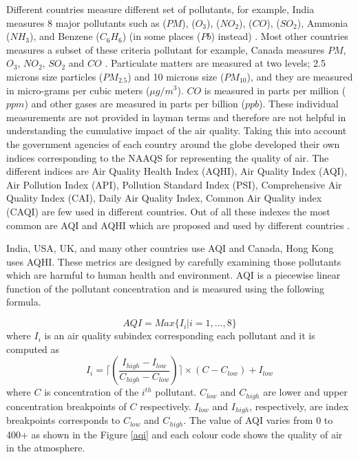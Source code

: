 Different countries measure different set of pollutants, for example, India measures 8 major pollutants such as ($PM$), ($O_3$), ($NO_2$), ($CO$), ($SO_2$), Ammonia ($NH_3$), and Benzene ($C_6H_6$) (in some places ($Pb$) instead) \cite{Chen2013}. Most other countries measures a subset of these criteria pollutant for example, Canada measures $PM$, $O_3$, $NO_2$, $SO_2$ and $CO$ \cite{Chen2013}. Particulate matters are measured at two levels; 2.5 microns size particles ($PM_{2.5}$) and 10 microns size ($PM_{10}$), and they are measured in micro-grams per cubic meters ($\mu g/m^3$). $CO$ is measured in parts per million ($ppm$) and other gases are measured in parts per billion ($ppb$). These individual measurements are not provided in layman terms and therefore are not helpful in understanding the cumulative impact of the air quality. Taking this into account the government agencies of each country around the globe developed their own indices corresponding to the NAAQS for representing the quality of air. The different indices are Air Quality Health Index (AQHI), Air Quality Index (AQI), Air Pollution Index (API), Pollution Standard Index (PSI), Comprehensive Air Quality Index (CAI), Daily Air Quality Index, Common Air Quality index (CAQI) are few used in different countries.
Out of all these indexes the most common are AQI and AQHI which are proposed and used by different countries \cite{Chen2013}.

India, USA, UK, and many other countries use AQI and Canada, Hong Kong uses AQHI. These metrics are designed  by carefully examining those pollutants which are harmful to human health and environment.
AQI is a piecewise linear function of the pollutant concentration \cite{Soni2016} and is measured using the following formula.

\begin{equation}
AQI = Max \{I_i|i = 1, ..., 8\}
\end{equation}
where $I_i$ is an air quality subindex corresponding each pollutant and it is computed as 
\begin{equation}
I_i = \lceil(\frac{I_{high} - I_{low}}{C_{high} - C_{low}})\rceil \times (C - C_{low}) + I_{low}
\end{equation}
where $C$ is concentration of the $i^{th}$ pollutant. $C_{low}$ and $C_{high}$ are lower and upper concentration breakpoints of $C$ respectively.
$I_{low}$ and $I_{high}$, respectively, are index breakpoints corresponds to $C_{low}$ and $C_{high}$.  The value of AQI varies from 0 to 400+ as shown in the Figure \ref{aqi} and each colour code shows the quality of air in the atmosphere.


